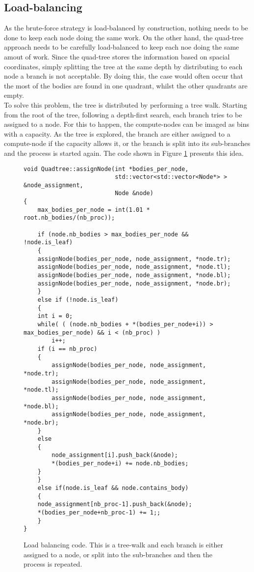 \subsection{Load-balancing}
As the brute-force strategy is load-balanced by construction, nothing needs to be done to keep each node doing the same work. On the other hand, the quad-tree approach needs to be carefully load-balanced to keep each noe doing the same amout of work. Since the quad-tree stores the information based on spacial coordinates, simply splitting the tree at the same depth by distributing to each node a branch is not acceptable. By doing this, the case would often occur that the most of the bodies are found in one quadrant, whilst the other quadrants are empty.\\
To solve this problem, the tree is distributed by performing a tree walk. Starting from the root of the tree, following a depth-first search, each  branch tries to be assigned to a node. For this to happen, the compute-nodes can be imaged as bins with a capacity. As the tree is explored, the branch are either assigned to a compute-node if the capacity allows it, or the branch is split into its sub-branches and the process is started again. The code shown in Figure \ref{fig:load-balancing} presents this idea.
\begin{figure}
  \begin{verbatim}
void Quadtree::assignNode(int *bodies_per_node,
                          std::vector<std::vector<Node*> > &node_assignment,
                          Node &node)
{
    max_bodies_per_node = int(1.01 * root.nb_bodies/(nb_proc));

    if (node.nb_bodies > max_bodies_per_node && !node.is_leaf)
    {
	assignNode(bodies_per_node, node_assignment, *node.tr);
	assignNode(bodies_per_node, node_assignment, *node.tl);
	assignNode(bodies_per_node, node_assignment, *node.bl);
	assignNode(bodies_per_node, node_assignment, *node.br);
    }
    else if (!node.is_leaf)
    {
	int i = 0;
	while( ( (node.nb_bodies + *(bodies_per_node+i)) > max_bodies_per_node) && i < (nb_proc) )	
	    i++;
	if (i == nb_proc)
	{	  
	    assignNode(bodies_per_node, node_assignment, *node.tr);
	    assignNode(bodies_per_node, node_assignment, *node.tl);
	    assignNode(bodies_per_node, node_assignment, *node.bl);
	    assignNode(bodies_per_node, node_assignment, *node.br);
	}
	else
	{
	    node_assignment[i].push_back(&node);
	    *(bodies_per_node+i) += node.nb_bodies;
	}	
    }
    else if(node.is_leaf && node.contains_body)
    {
	node_assignment[nb_proc-1].push_back(&node);
	*(bodies_per_node+nb_proc-1) += 1;;
    }
}
  \end{verbatim}
\caption{Load balancing code. This is a tree-walk and each branch is either assigned to a node, or split into the sub-branches and then the process is repeated.}
\label{fig:load-balancing}
\end{figure}
